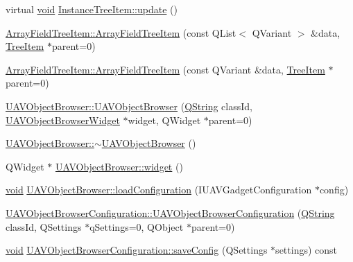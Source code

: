\begin{DoxyCompactItemize}
\item 
virtual \hyperlink{group___u_a_v_objects_plugin_ga444cf2ff3f0ecbe028adce838d373f5c}{void} \hyperlink{group___u_a_v_object_browser_plugin_ga2f98ddf82fa4ee89c654de207ba2f551}{\-Instance\-Tree\-Item\-::update} ()
\item 
\hyperlink{group___u_a_v_object_browser_plugin_gac1bacf7300e5dcaad4bb7da856408a99}{\-Array\-Field\-Tree\-Item\-::\-Array\-Field\-Tree\-Item} (const \-Q\-List$<$ \-Q\-Variant $>$ \&data, \hyperlink{class_tree_item}{\-Tree\-Item} $\ast$parent=0)
\item 
\hyperlink{group___u_a_v_object_browser_plugin_gaa011115b44f5875931af40aa93a80e97}{\-Array\-Field\-Tree\-Item\-::\-Array\-Field\-Tree\-Item} (const \-Q\-Variant \&data, \hyperlink{class_tree_item}{\-Tree\-Item} $\ast$parent=0)
\item 
\hyperlink{group___u_a_v_object_browser_plugin_ga9723050126ebdcc8952f6190cf8f7dbf}{\-U\-A\-V\-Object\-Browser\-::\-U\-A\-V\-Object\-Browser} (\hyperlink{group___u_a_v_objects_plugin_gab9d252f49c333c94a72f97ce3105a32d}{\-Q\-String} class\-Id, \hyperlink{class_u_a_v_object_browser_widget}{\-U\-A\-V\-Object\-Browser\-Widget} $\ast$widget, \-Q\-Widget $\ast$parent=0)
\item 
\hyperlink{group___u_a_v_object_browser_plugin_gacacc07d4e73a9da5c6faee7763dde1b4}{\-U\-A\-V\-Object\-Browser\-::$\sim$\-U\-A\-V\-Object\-Browser} ()
\item 
\-Q\-Widget $\ast$ \hyperlink{group___u_a_v_object_browser_plugin_ga8ed7f7a3fa9ad46c595ee27903636dfe}{\-U\-A\-V\-Object\-Browser\-::widget} ()
\item 
\hyperlink{group___u_a_v_objects_plugin_ga444cf2ff3f0ecbe028adce838d373f5c}{void} \hyperlink{group___u_a_v_object_browser_plugin_gaf13947eb936ed7bb3d885d099fcc5ca2}{\-U\-A\-V\-Object\-Browser\-::load\-Configuration} (\-I\-U\-A\-V\-Gadget\-Configuration $\ast$config)
\item 
\hyperlink{group___u_a_v_object_browser_plugin_ga70fd7664c3f0a9a97f0003bc04e5dc42}{\-U\-A\-V\-Object\-Browser\-Configuration\-::\-U\-A\-V\-Object\-Browser\-Configuration} (\hyperlink{group___u_a_v_objects_plugin_gab9d252f49c333c94a72f97ce3105a32d}{\-Q\-String} class\-Id, \-Q\-Settings $\ast$q\-Settings=0, \-Q\-Object $\ast$parent=0)
\item 
\hyperlink{group___u_a_v_objects_plugin_ga444cf2ff3f0ecbe028adce838d373f5c}{void} \hyperlink{group___u_a_v_object_browser_plugin_gadb33bf1275b4c9f13153755f9f333042}{\-U\-A\-V\-Object\-Browser\-Configuration\-::save\-Config} (\-Q\-Settings $\ast$settings) const 

\end{DoxyCompactItemize}
